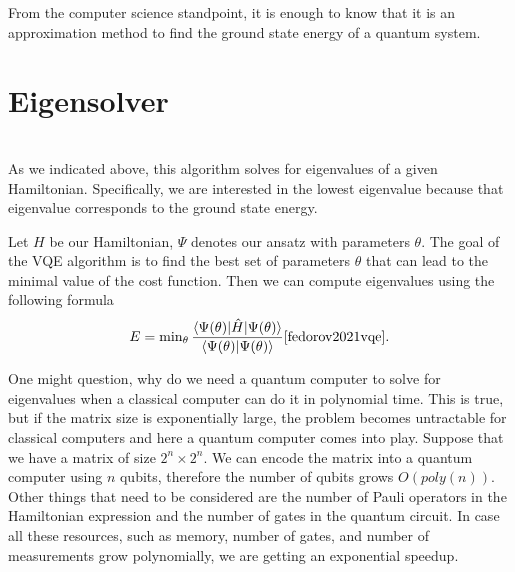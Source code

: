 From the computer science standpoint, it is enough to know that it is an approximation method to find the ground state energy of a quantum system.

\section{Eigensolver}
\\
As we indicated above, this algorithm solves for eigenvalues of a given Hamiltonian. Specifically, we are interested in the lowest eigenvalue because that eigenvalue corresponds to the ground state energy. 

Let $H$ be our Hamiltonian, $\Psi$ denotes our ansatz with parameters $\theta$. The goal of the VQE algorithm is to find the best set of parameters $\theta$ that can lead to the minimal value of the cost function. Then we can compute eigenvalues using the following formula 
\begin{equation} \label{eq:cost-function}
E = \min\nolimits_{\theta} \frac{\langle\Psi(\theta)\rvert\hat{H}\lvert\Psi(\theta)\rangle}{\langle\Psi(\theta)\vert\Psi(\theta)\rangle}\cite{fedorov2021vqe} \text{.}
\end{equation}


One might question, why do we need a quantum computer to solve for eigenvalues when a classical computer can do it in polynomial time. This is true, but if the matrix size is exponentially large, the problem becomes untractable for classical computers and here a quantum computer comes into play. Suppose that we have a matrix of size $2^n \times 2^n$. We can encode the matrix into a quantum computer using $n$ qubits, therefore the number of qubits grows $O(poly(n))$. Other things that need to be considered are the number of Pauli operators in the Hamiltonian expression and the number of gates in the quantum circuit. In case all these resources, such as memory, number of gates, and number of measurements grow polynomially, we are getting an exponential speedup.


